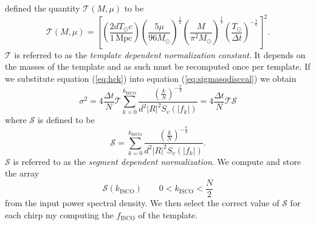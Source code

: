 defined the quantity $\mathcal{T}(M,\mu)$ to be
\begin{equation}
\mathcal{T}(M,\mu) = \left[
\left(\frac{2dT_\odot c}{1\,\mathrm{Mpc}}\right)
\left(\frac{5\mu}{96M_\odot}\right)^\frac{1}{2}
\left(\frac{M}{\pi^2M_\odot}\right)^\frac{1}{3}
\left(\frac{T_\odot}{\Delta t}\right)^{-\frac{1}{6}}
\right]^2.
\end{equation}
$\mathcal{T}$ is referred to as the \emph{template dependent normalization
constant}. It depends on the masses of the template and as such must be
recomputed once per template. If we substitute equation (\ref{eq:hck}) 
into equation (\ref{eq:sigmasqdisccal}) we obtain
\begin{equation}
\sigma^2 = 4 \frac{\Delta t}{N} \mathcal{T} 
\sum_{k=0}^{k_\mathrm{ISCO}} 
\frac{\left(\frac{k}{N}\right)^{-\frac{7}{3}}}
{d^2|R|^2S_v\left(\left|f_k\right|\right)}
= 4 \frac{\Delta t}{N} \mathcal{T} \mathcal{S}
\end{equation}
where $\mathcal{S}$ is defined to be
\begin{equation}
\mathcal{S} = 
\sum_{k=0}^{k_\mathrm{ISCO}} 
\frac{\left(\frac{k}{N}\right)^{-\frac{7}{3}}}{d^2|R|^2S_v\left(\left|f_k\right|\right)}.
\end{equation}
$\mathcal{S}$ is referred to as the \emph{segment dependent normalization}.
We compute and store the array 
\begin{equation}
\mathcal{S}(k_\mathrm{ISCO}) \quad \quad 0 < k_\mathrm{ISCO} < \frac{N}{2}
\end{equation}
from the input power spectral density. We then select the correct value of
$\mathcal{S}$ for each chirp my computing the $f_\mathrm{ISCO}$ of the
template.

